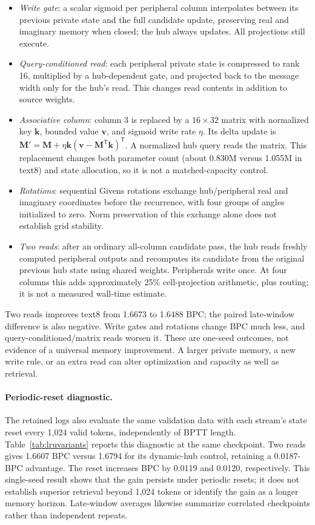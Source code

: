 \documentclass[letterpaper,twoside]{article}
\begin{document}
\begin{itemize}
\item \emph{Write gate}: a scalar sigmoid per peripheral column interpolates between its previous private state and the full candidate update, preserving real and imaginary memory when closed; the hub always updates. All projections still execute.
\item \emph{Query-conditioned read}: each peripheral private state is compressed to rank 16, multiplied by a hub-dependent gate, and projected back to the message width only for the hub's read. This changes read contents in addition to source weights.
\item \emph{Associative column}: column 3 is replaced by a $16\times32$ matrix with normalized key $\mathbf{k}$, bounded value $\mathbf{v}$, and sigmoid write rate $\eta$. Its delta update is $\mathbf{M}'=\mathbf{M}+\eta\mathbf{k}(\mathbf{v}-\mathbf{M}^{\mathsf T}\mathbf{k})^{\mathsf T}$. A normalized hub query reads the matrix. This replacement changes both parameter count (about 0.830M versus 1.055M in text8) and state allocation, so it is not a matched-capacity control.
\item \emph{Rotations}: sequential Givens rotations exchange hub/peripheral real and imaginary coordinates before the recurrence, with four groups of angles initialized to zero. Norm preservation of this exchange alone does not establish grid stability.
\item \emph{Two reads}: after an ordinary all-column candidate pass, the hub reads freshly computed peripheral outputs and recomputes its candidate from the original previous hub state using shared weights. Peripherals write once. At four columns this adds approximately 25\% cell-projection arithmetic, plus routing; it is not a measured wall-time estimate.
\end{itemize}



Two reads improves text8 from 1.6673 to 1.6488 BPC; the paired late-window difference is also negative. Write gates and rotations change BPC much less, and query-conditioned/matrix reads worsen it. These are one-seed outcomes, not evidence of a universal memory improvement. A larger private memory, a new write rule, or an extra read can alter optimization and capacity as well as retrieval.

\paragraph{Periodic-reset diagnostic.}
The retained logs also evaluate the same validation data with each stream's state reset every 1,024 valid tokens, independently of BPTT length. Table~\ref{tab:lruvariants} reports this diagnostic at the same checkpoint. Two reads gives 1.6607 BPC versus 1.6794 for its dynamic-hub control, retaining a 0.0187-BPC advantage. The reset increases BPC by 0.0119 and 0.0120, respectively. This single-seed result shows that the gain persists under periodic resets; it does not establish superior retrieval beyond 1,024 tokens or identify the gain as a longer memory horizon. Late-window averages likewise summarize correlated checkpoints rather than independent repeats.
\end{document}
